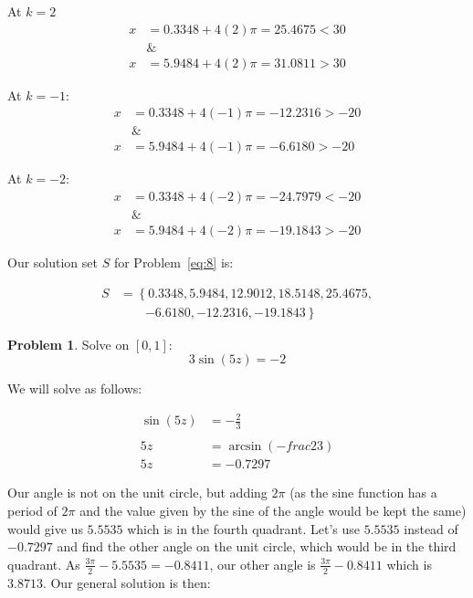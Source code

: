 \documentclass[12pt]{article}
\theoremstyle{definition}
\newtheorem{problem}{Problem}
\begin{document}
At $k=2$
\begin{align}
    x         & = 0.3348 + 4(2)\pi = 25.4675 < 30 \\
    \nonumber & \&                                \\
    x         & = 5.9484 + 4(2)\pi = 31.0811 > 30
\end{align}

At $k=-1$:
\begin{align}
    x         & = 0.3348 + 4(-1)\pi = -12.2316 > -20 \\
    \nonumber & \&                                   \\
    x         & = 5.9484 + 4(-1)\pi = -6.6180 > -20
\end{align}

At $k=-2$:
\begin{align}
    x         & = 0.3348 + 4(-2)\pi = -24.7979 < -20 \\
    \nonumber & \&                                   \\
    x         & = 5.9484 + 4(-2)\pi = -19.1843 > -20
\end{align}

Our solution set $S$ for Problem~\eqref{eq:8} is:

\begin{equation}
    \begin{aligned}
        S & = \left\{ 0.3348, 5.9484, 12.9012, 18.5148, 25.4675, \right. \\
          & \qquad \left. -6.6180, -12.2316, -19.1843 \right\}
    \end{aligned}
\end{equation}

\begin{problem}
Solve on $[0, 1]$:
\begin{equation*}
    3\sin(5z) = -2 \label{eq:9}
\end{equation*}
\end{problem}

We will solve as follows:

\begin{align}
    \sin(5z) & = -\frac{2}{3}                    \\
    \nonumber                                    \\
    5z       & = \arcsin\left(-frac{2}{3}\right) \\
    5z       & = -0.7297
\end{align}

Our angle is not on the unit circle, but adding $2\pi$ (as the sine function has a period of $2\pi$ and the value given by the sine of the angle would be kept the same) would give us $5.5535$ which is in the fourth quadrant.
Let's use $5.5535$ instead of $-0.7297$ and find the other angle on the unit circle, which would be in the third quadrant.
As $\frac{3\pi}{2}-5.5535=-0.8411$, our other angle is $\frac{3\pi}{2}-0.8411$ which is $3.8713$.
Our general solution is then:
\end{document}
